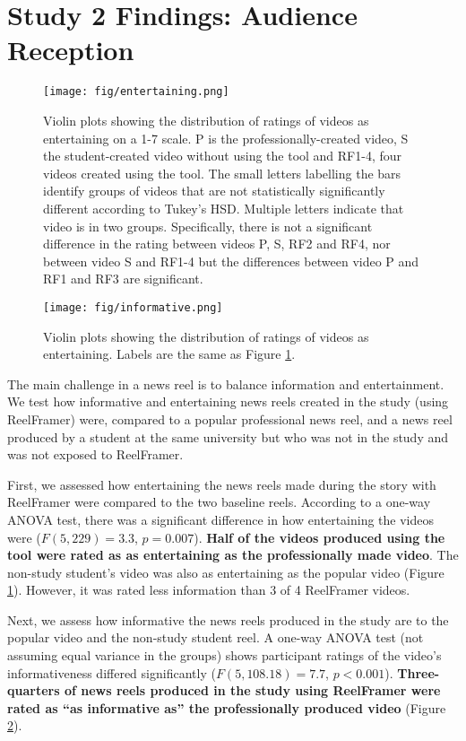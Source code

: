 \section{Study 2 Findings: Audience Reception} 
\label{market_research}

\begin{figure}[t]
    \centering
    \texttt{[image: fig/entertaining.png]}
    \caption{Violin plots showing the distribution of ratings of videos as entertaining on a 1-7 scale. P is the professionally-created video, S the student-created video without using the tool and RF1-4, four videos created using the tool. The small letters labelling the bars identify groups of videos that are not statistically significantly different according to Tukey's HSD. Multiple letters indicate that video is in two groups. Specifically, there is not a significant difference in the rating between videos P, S, RF2 and RF4, nor between video S and RF1-4 but the differences between video P and RF1 and RF3 are significant.}
    \label{fig:entertaining}
\end{figure}

\begin{figure}[t]
    \centering
    \texttt{[image: fig/informative.png]}
    \caption{Violin plots showing the distribution of ratings of videos as entertaining. Labels are the same as Figure \ref{fig:entertaining}.}
    \label{fig:informative}
\end{figure}

The main challenge in a news reel is to balance information and entertainment. 
We test how informative and entertaining news reels created in the study (using ReelFramer) were, compared to a popular professional news reel, and a news reel produced by a student at the same university but who was not in the study and was not exposed to ReelFramer. 

First, we assessed how entertaining the news reels made during the story with ReelFramer were compared to the two baseline reels.
According to a one-way ANOVA test, there was a significant difference in how entertaining the videos were ($F(5,229)=3.3$, $p=0.007$). \textbf{Half of the videos produced using the tool were rated as as entertaining as the professionally made video}. 
The non-study student's video was also as entertaining as the popular video (Figure \ref{fig:entertaining}). However, it was rated less information than 3 of 4 ReelFramer videos. 

Next, we assess how informative the news reels produced in the study are to the popular video and the non-study student reel.
A one-way ANOVA test (not assuming equal variance in the groups) shows participant ratings of the video’s informativeness differed significantly ($F(5,108.18)=7.7$, $p<0.001$). 
\textbf{Three-quarters of news reels produced in the study using ReelFramer were rated as ``as informative as'' the professionally produced video} (Figure \ref{fig:informative}). 

